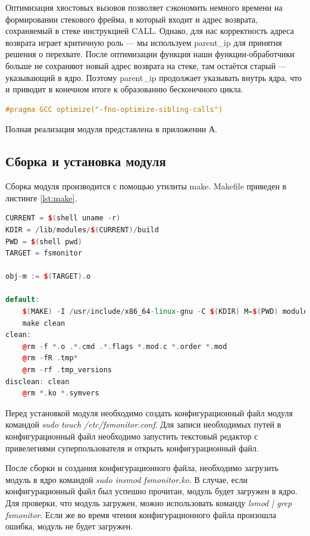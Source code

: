 \documentclass[a4paper,14pt]{article}
\begin{document}
Оптимизация хвостовых вызовов позволяет сэкономить немного времени на формировании стекового фрейма, в который входит и адрес возврата, сохраняемый в стеке инструкцией CALL. Однако, для нас корректность адреса возврата играет критичную роль — мы используем parent\_ip для принятия решения о перехвате. После оптимизации функция наши функции-обработчики больше не сохраняют новый адрес возврата на стеке, там остаётся старый — указывающий в ядро. Поэтому parent\_ip продолжает указывать внутрь ядра, что и приводит в конечном итоге к образованию бесконечного цикла.


\begin{lstlisting}[language=C++,label={lst:tail}, caption=\text{Отключение оптимизации хвостовых вызовов.}]
#pragma GCC optimize("-fno-optimize-sibling-calls")
\end{lstlisting}


Полная реализация модуля представлена в приложении А.

\subsection{Сборка и установка модуля}

Сборка модуля производится с помощью утилиты make. Makefile приведен в листинге \ref{lst:make}.

\begin{lstlisting}[language=C++,label={lst:make}, caption=\text{Makefile.}]
CURRENT = $(shell uname -r)
KDIR = /lib/modules/$(CURRENT)/build
PWD = $(shell pwd)
TARGET = fsmonitor
	
obj-m := $(TARGET).o 
	
default:
	$(MAKE) -I /usr/include/x86_64-linux-gnu -C $(KDIR) M=$(PWD) modules
	make clean
clean:
	@rm -f *.o .*.cmd .*.flags *.mod.c *.order *.mod
	@rm -fR .tmp*
	@rm -rf .tmp_versions
disclean: clean
	@rm *.ko *.symvers
\end{lstlisting}

Перед установкой модуля необходимо создать конфигурационный файл модуля командой \textit{sudo touch /etc/fsmonitor.conf}. Для записи необходимых путей в конфигурационный файл необходимо запустить текстовый редактор с привелегиями суперпользователя и открыть конфигурационный файл. 

После сборки и создания конфигурационного файла, необходимо загрузить модуль в ядро командой \textit{sudo insmod fsmonitor.ko}. В случае, если конфигурационный файл был успешно прочитан, модуль будет загружен в ядро. Для проверки, что модуль загружен, можно использовать команду \textit{lsmod | grep fsmonitor}. Если же во время чтения конфигурационного файла произошла ошибка, модуль не будет загружен.
\end{document}
